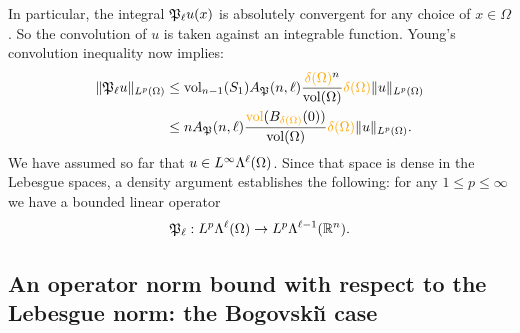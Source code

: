 \documentclass[10pt,letterpaper]{article}
\newcommand\cye[1]{%
  \protect\leavevmode
  \begingroup
    \color{red!35!yellow}%
    #1%
  \endgroup
}
\begin{document}
In particular, the integral ${\mathfrak P}_{\ell} u(x)$ is absolutely convergent for any choice of $x \in \Omega$. 
So the convolution of $u$ is taken against an integrable function. 
Young's convolution inequality now implies: 
\begin{align*}
    \| \Poinc_{\ell} u \|_{L^{p}(\Omega)}
    &
    \leq 
    \vol_{n-1}(S_1) A_{\Poinc}(n,\ell) \frac{ \cye{\diam(\Omega)}^{n} }{\vol(\Omega)} 
    \cye{\diam(\Omega)}
    \| u \|_{L^{p}(\Omega)}
    \\&
    \leq 
    n A_{\Poinc}(n,\ell) \frac{ \cye{\vol}(B_{\cye{\diam(\Omega)}}(0)) }{\vol(\Omega)} 
    \cye{\diam(\Omega)}
    \| u \|_{L^{p}(\Omega)}
    .
\end{align*}
We have assumed so far that $u \in L^{\infty}\Lambda^{\ell}(\Omega)$. 
Since that space is dense in the Lebesgue spaces, a density argument establishes the following: 
for any $1 \leq p \leq \infty$ we have a bounded linear operator 
\begin{gather*}
    {\mathfrak P}_{\ell} : L^{p}\Lambda^{\ell}(\Omega) \rightarrow L^{p}\Lambda^{\ell-1}({\mathbb R}^n).
\end{gather*}
% 

\subsection{\cye{An operator norm bound with respect to the Lebesgue norm: the Bogovski\u{\i} case}}
\end{document}
